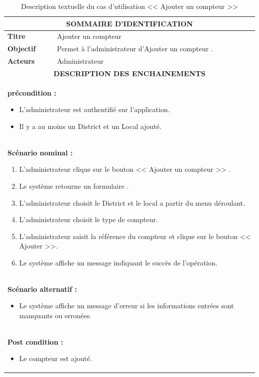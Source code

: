 \documentclass[12pt]{report}
\begin{document}


\begin{table}[H]
\centering
\def\arraystretch{1.5}
\begin{tabular}{|p{2.5cm}|p{14.5cm}|}
   \hline
   \multicolumn{2}{|c|}{
   \textbf{SOMMAIRE D'IDENTIFICATION}
   } \\
   \hline
    \textbf{Titre}  &    Ajouter un compteur \ \\
   \hline
   \textbf{Objectif}  & Permet à l'administrateur d'Ajouter un compteur .  \\
   \hline
    \textbf{Acteurs}  &  Administrateur\\
   \hline
   \multicolumn{2}{|c|}{ \textbf{DESCRIPTION DES ENCHAINEMENTS} } \\
   \hline
   \multicolumn{2}{|p{17cm}|}{\textbf{ précondition : }
   \begin{itemize}[label={$\bullet$}]
      \item  L'administrateur est authentifié sur l'application. 
      \item   Il y a au moins un District et un Local ajouté. 
   \end{itemize}} \\
   \hline
   \multicolumn{2}{|p{17cm}|}{\textbf{ Scénario nominal : }
   \begin{enumerate}
      \item  L'administrateur clique sur le bouton << Ajouter un compteur >> .
      \item  Le système retourne un formulaire  .
      \item  L'administrateur choisit le District et le local a partir du menu déroulant.
      \item  L'administrateur choisit  le type de compteur.
      \item  L'administrateur saisit la référence du compteur et clique sur le bouton << Ajouter >>.
      \item Le système affiche un message indiquant le succès de l'opération.
      
   \end{enumerate}} \\
   \hline
   \multicolumn{2}{|p{17cm}|}{\textbf{ Scénario alternatif : }
   \begin{itemize}[label={$\bullet$}]
      \item  Le système affiche un message d'erreur si les  informations entrées sont manquants ou erronées.     
   \end{itemize}} \\
   \hline
   \multicolumn{2}{|p{17cm}|}{\textbf{ Post condition : }
   \begin{itemize}[label={$\bullet$}]
      \item  Le compteur est ajouté.
   \end{itemize}} \\
   \hline
\end{tabular}
\caption{Description textuelle du cas d'utilisation << Ajouter un compteur >>}
\end{table}
\end{document}
